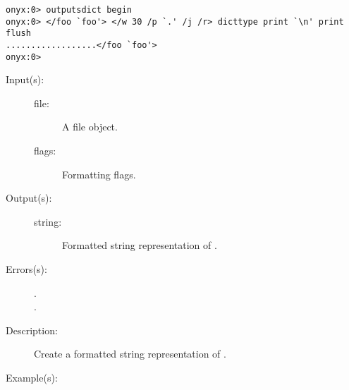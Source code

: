 \begin{description}
\begin{description}
\begin{verbatim}
onyx:0> outputsdict begin
onyx:0> </foo `foo'> </w 30 /p `.' /j /r> dicttype print `\n' print flush
..................</foo `foo'>
onyx:0>
		\end{verbatim}
	\end{description}
\label{outputsdict:filetype}
\item[{\onyxop{file flags}{filetype}{string}}: ]
	\begin{description}\item[]
	\item[Input(s): ]
		\begin{description}\item[]
		\item[file: ]
			A file object.
		\item[flags: ]
			Formatting flags.
		\end{description}
	\item[Output(s): ]
		\begin{description}\item[]
		\item[string: ]
			Formatted string representation of .
		\end{description}
	\item[Errors(s): ]
		\begin{description}\item[]
		\item[.]
		\item[.]
		\end{description}
	\item[Description: ]
		Create a formatted string representation of .
	\item[Example(s): ]\begin{verbatim}


\end{verbatim}
\end{description}
\end{description}
